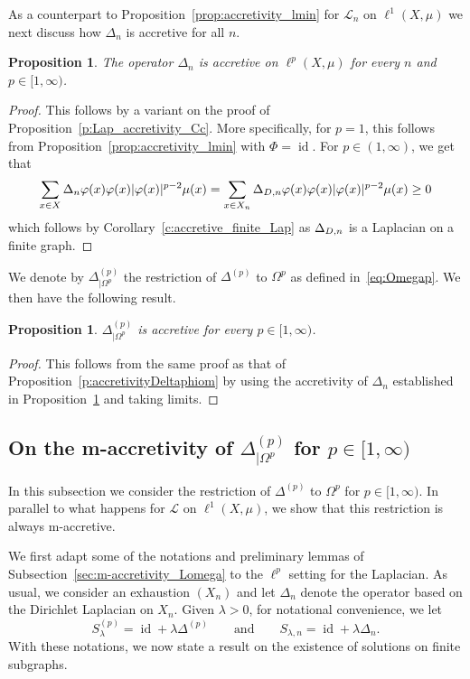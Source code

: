\documentclass[letterpaper]{article}
\newtheorem{proposition}[lemma]{Proposition}
\theoremstyle{definition}
\theoremstyle{named}
\numberwithin{equation}{section}
\newcommand{\id}{\operatorname{id}}
\newcommand{\Deltaphi}{\mathcal{L}}
\newcommand{\Deltadir}[1][]{\Delta_{D\ifx&#1&\else,#1\fi}}
\begin{document}
As a counterpart to Proposition~\ref{prop:accretivity_lmin}
for $\mathcal{L}_n$ on $\ell^1(X,\mu)$ we next discuss how $\Delta_n$ is accretive for all $n$.
\begin{proposition}\label{prop:accretivity_deltamin}
The operator $\Delta_n$ is accretive on $\ell^p(X,\mu)$ for every $n$ and $p\in[1,\infty)$.
\end{proposition}
\begin{proof}
    This follows by a variant on the proof of Proposition~\ref{p:Lap_accretivity_Cc}.
    More specifically, for $p=1$, this follows from Proposition~\ref{prop:accretivity_lmin} with $\Phi=\id$.
    For $p \in (1,\infty)$, 
    we get that
    $$\sum_{x \in X} \Delta_n\varphi(x)  \varphi(x) |\varphi(x)|^{p-2} \mu(x)=
    \sum_{x \in X_n} \Deltadir[n] \varphi(x)  \varphi(x) |\varphi(x)|^{p-2} \mu(x) \geq 0$$
    which follows by Corollary~\ref{c:accretive_finite_Lap}
    as $\Deltadir[n]$ is a Laplacian on a finite graph.
\end{proof}


We denote by $\Delta^{(p)}_{|\Omega^p}$ the restriction of $\Delta^{(p)}$ to $\Omega^p$ as defined in~\eqref{eq:Omegap}. We then have the following result.
\begin{proposition}\label{p:accretivityDeltap}
   $\Delta^{(p)}_{|\Omega^p}$ is accretive for every $p\in [1,\infty)$. 
\end{proposition}
\begin{proof}
This follows from the same proof as that of 
Proposition~\ref{p:accretivityDeltaphiom} by using the accretivity of $\Delta_n$ established in Proposition~\ref{prop:accretivity_deltamin} and taking limits.
\end{proof}



\subsection{\texorpdfstring{On the m-accretivity of $\Delta^{(p)}_{|\Omega^p}$ for $p\in[1,\infty)$}{On the m-accretivity of Delta p on Omegap for p in [1,infty)}}\label{sec:m-accretivity_Deltap_omega}
In this subsection we consider the restriction of $\Delta^{(p)}$ to $\Omega^p$ for $p \in [1,\infty)$.
In parallel to what happens for $\Deltaphi$ on $\ell^1(X,\mu)$, we show that
this restriction is always m-accretive.




We first  adapt some of the notations and  preliminary lemmas of Subsection~\ref{sec:m-accretivity_Lomega} to 
the $\ell^p$ setting for the Laplacian. As usual, we consider an exhaustion $(X_n)$ and let
$\Delta_n$ denote the operator based on the Dirichlet Laplacian on $X_n$.
Given $\lambda>0$, for notational convenience, we let 
$$
S^{(p)}_\lambda = \id + \lambda \Delta^{(p)} \qquad \mbox{and} \qquad S_{\lambda,n} = \id + \lambda \Delta_n.
$$
With these notations, we now state a result on the existence of solutions on finite subgraphs.
\end{document}
